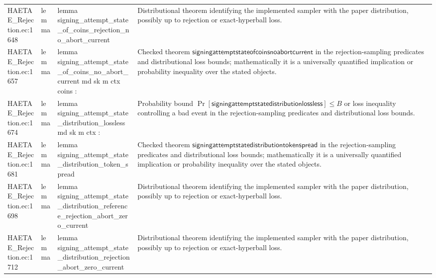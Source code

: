 \documentclass[10pt]{article}
\begin{document}
\begin{longtable}{L{0.11\textwidth}L{0.055\textwidth}L{0.385\textwidth}L{0.41\textwidth}}
HAETAE\_\allowbreak{}Rejection.\allowbreak{}ec:\allowbreak{}1648 & lemma & {\ttfamily\scriptsize lemma signing\_\allowbreak{}attempt\_\allowbreak{}state\_\allowbreak{}of\_\allowbreak{}coins\_\allowbreak{}rejection\_\allowbreak{}no\_\allowbreak{}abort\_\allowbreak{}current} & Distributional theorem identifying the implemented sampler with the paper distribution, possibly up to rejection or exact-hyperball loss. \\
HAETAE\_\allowbreak{}Rejection.\allowbreak{}ec:\allowbreak{}1657 & lemma & {\ttfamily\scriptsize lemma signing\_\allowbreak{}attempt\_\allowbreak{}state\_\allowbreak{}of\_\allowbreak{}coins\_\allowbreak{}no\_\allowbreak{}abort\_\allowbreak{}current md sk m ctx coins :} & Checked theorem $\mathsf{signingattemptstateofcoinsnoabortcurrent}$ in the rejection-sampling predicates and distributional loss bounds; mathematically it is a universally quantified implication or probability inequality over the stated objects. \\
HAETAE\_\allowbreak{}Rejection.\allowbreak{}ec:\allowbreak{}1674 & lemma & {\ttfamily\scriptsize lemma signing\_\allowbreak{}attempt\_\allowbreak{}state\_\allowbreak{}distribution\_\allowbreak{}lossless md sk m ctx :} & Probability bound $\Pr[\mathsf{signingattemptstatedistributionlossless}]\le B$ or loss inequality controlling a bad event in the rejection-sampling predicates and distributional loss bounds. \\
HAETAE\_\allowbreak{}Rejection.\allowbreak{}ec:\allowbreak{}1681 & lemma & {\ttfamily\scriptsize lemma signing\_\allowbreak{}attempt\_\allowbreak{}state\_\allowbreak{}distribution\_\allowbreak{}token\_\allowbreak{}spread} & Checked theorem $\mathsf{signingattemptstatedistributiontokenspread}$ in the rejection-sampling predicates and distributional loss bounds; mathematically it is a universally quantified implication or probability inequality over the stated objects. \\
HAETAE\_\allowbreak{}Rejection.\allowbreak{}ec:\allowbreak{}1698 & lemma & {\ttfamily\scriptsize lemma signing\_\allowbreak{}attempt\_\allowbreak{}state\_\allowbreak{}distribution\_\allowbreak{}reference\_\allowbreak{}rejection\_\allowbreak{}abort\_\allowbreak{}zero\_\allowbreak{}current} & Distributional theorem identifying the implemented sampler with the paper distribution, possibly up to rejection or exact-hyperball loss. \\
HAETAE\_\allowbreak{}Rejection.\allowbreak{}ec:\allowbreak{}1712 & lemma & {\ttfamily\scriptsize lemma signing\_\allowbreak{}attempt\_\allowbreak{}state\_\allowbreak{}distribution\_\allowbreak{}rejection\_\allowbreak{}abort\_\allowbreak{}zero\_\allowbreak{}current} & Distributional theorem identifying the implemented sampler with the paper distribution, possibly up to rejection or exact-hyperball loss. \\

\end{longtable}
\end{document}
